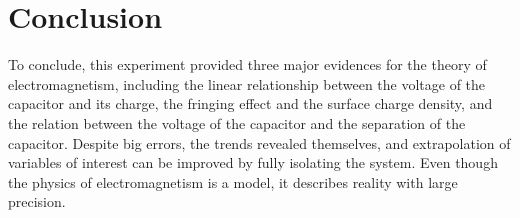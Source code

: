 \section{Conclusion}

To conclude, this experiment provided three major evidences for the theory of electromagnetism, including the linear relationship between the voltage of the capacitor and its charge, the fringing effect and the surface charge density, and the relation between the voltage of the capacitor and the separation of the capacitor. Despite big errors, the trends revealed themselves, and extrapolation of variables of interest can be improved by fully isolating the system. Even though the physics of electromagnetism is a model, it describes reality with large precision.